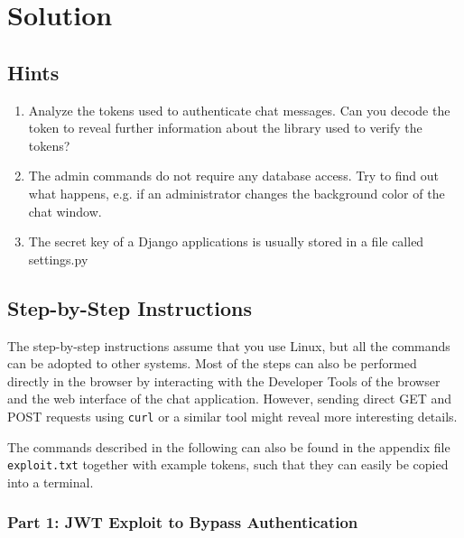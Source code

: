 \documentclass[12pt,a4paper]{article}
\newcommand{\code}[1]{\texttt{#1}}
\begin{document}
\section{Solution}

\subsection{Hints}
\begin{enumerate}
	\item Analyze the tokens used to authenticate chat messages. Can you decode the token to reveal further information about the library used to verify the tokens?
	\item The admin commands do not require any database access. Try to find out what happens, e.g. if an administrator changes the background color of the chat window.
	\item The secret key of a Django applications is usually stored in a file called settings.py
\end{enumerate}

\subsection{Step-by-Step Instructions}

The step-by-step instructions assume that you use Linux, but all the commands can be adopted to other systems. Most of the steps can also be performed directly in the browser by interacting with the Developer Tools of the browser and the web interface of the chat application. However, sending direct GET and POST requests using \code{curl} or a similar tool might reveal more interesting details.

The commands described in the following can also be found in the appendix file \code{exploit.txt} together with example tokens, such that they can easily be copied into a terminal.

\subsubsection{Part 1: JWT Exploit to Bypass Authentication}
\end{document}
